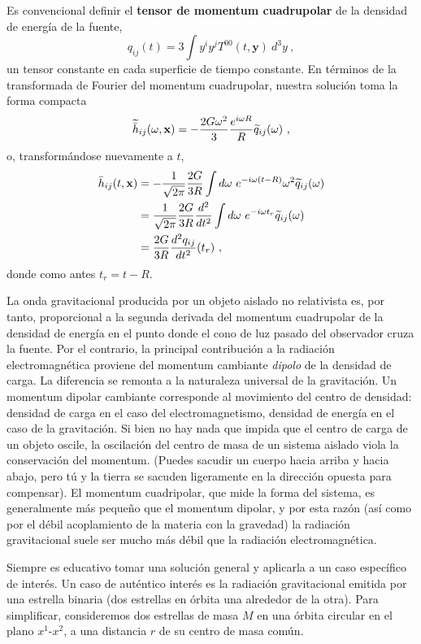 \documentclass[11pt,b5paper,openany,twoside]{book}
\def\bh{{\bar h}}
\def\x{\mathbf{x}}
\def\y{\mathbf{y}}
\begin{document}
Es convencional definir el {\bf tensor de momentum cuadrupolar} de la densidad de energía de la fuente,
\begin{equation}
q_{ij}(t) = 3\int y^i y^j T^{00}(t,\y)~d^3y\ ,\label{6.83}
\end{equation}
un tensor constante en cada superficie de tiempo constante.
En términos de la transformada de Fourier del momentum cuadrupolar, nuestra solución toma la forma compacta
\begin{equation}
\widetilde\bh_{ij}(\omega,\x) = -{{2G\omega^2}\over 3}
{{e^{i\omega R}}\over R} \widetilde q_{ij}(\omega)\ ,\label{6.84}
\end{equation}
o, transformándose nuevamente a $t$,
\begin{align}
\bh_{ij}(t,\x)  &=  -{1\over{\sqrt{2\pi}}}{{2G}\over {3R}}
\int d\omega~e^{-i\omega(t-R)}\omega^2\widetilde q_{ij}(\omega) \notag \\
&=  {1\over{\sqrt{2\pi}}}{{2G}\over {3R}}{{d^2}\over{dt^2}}
\int d\omega~e^{-i\omega t_r}\widetilde q_{ij}(\omega) \notag \\
&=  {{2G}\over {3R}}{{d^2 q_{ij}}\over{dt^2}}(t_r) \ , \label{6.85}
\end{align}
donde como antes $t_r = t-R$.

La onda gravitacional producida por un objeto aislado no relativista es, por tanto, proporcional a la segunda derivada del momentum cuadrupolar de la densidad de energía en el punto donde el cono de luz pasado del observador cruza la fuente.
Por el contrario, la principal contribución a la radiación electromagnética proviene del momentum cambiante {\it dipolo} de la densidad de carga.
La diferencia se remonta a la naturaleza universal de la gravitación.
Un momentum dipolar cambiante corresponde al movimiento del centro de densidad: densidad de carga en el caso del electromagnetismo, densidad de energía en el caso de la gravitación.
Si bien no hay nada que impida que el centro de carga de un objeto oscile, la oscilación del centro de masa de un sistema aislado viola la conservación del momentum.
(Puedes sacudir un cuerpo hacia arriba y hacia abajo, pero tú y la tierra se sacuden ligeramente en la dirección opuesta para compensar).
El momentum cuadripolar, que mide la forma del sistema, es generalmente más pequeño que el momentum dipolar, y por esta razón (así como por el débil acoplamiento de la materia con la gravedad) la radiación gravitacional suele ser mucho más débil que la radiación electromagnética.

Siempre es educativo tomar una solución general y aplicarla a un caso específico de interés.
Un caso de auténtico interés es la radiación gravitacional emitida por una estrella binaria (dos estrellas en órbita una alrededor de la otra).
Para simplificar, consideremos dos estrellas de masa $M$ en una órbita circular en el plano $x^1$-$x^2$, a una distancia $r$ de su centro de masa común.
\end{document}
